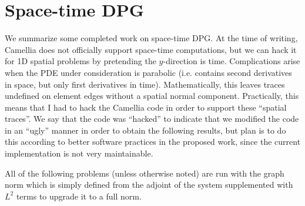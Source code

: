 \documentclass[Dissertation.tex]{subfiles}
\begin{document}
\chapter{Space-time DPG}
\label{sec:spacetime}
We summarize some completed work on space-time DPG. At the time of writing, Camellia does not officially support space-time computations, but we can hack it for 1D spatial problems by pretending the $y$-direction is time.
Complications arise when the PDE under consideration is parabolic (i.e. contains second derivatives in space, but only first derivatives in time). 
Mathematically, this leaves traces undefined on element edges without a spatial normal component. 
Practically, this means that I had to hack the Camellia code in order to support these ``spatial traces''.
We say that the code was ``hacked'' to indicate that we modified the code in an ``ugly'' manner in order to obtain the following results, 
but plan is to do this according to better software practices in the proposed work, since the current implementation is not very maintainable.

All of the following problems (unless otherwise noted) are run with the graph norm which is
simply defined from the adjoint of the system supplemented with $L^2$ terms to upgrade it to a full norm.

\end{document}
